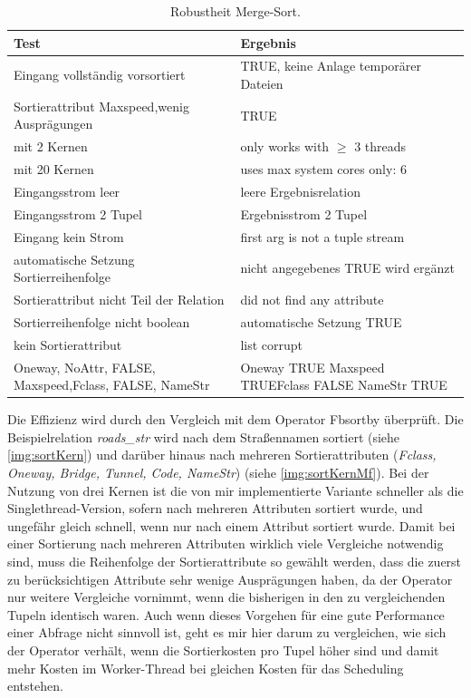 \documentclass[a4paper,12pt,twoside]{article}
\newcommand{\Fb}[1]{\textit{#1}} %
\begin{document}
\begin{table}
	\centering
	\begin{tabular}{|p{7.5cm}|p{7.5cm}|}
		\hline
		\rowcolor{gray!30}
		Test & Ergebnis \\
		\hline
		Eingang vollständig vorsortiert & TRUE, keine Anlage temporärer Dateien \\
		\hline
		Sortierattribut Maxspeed,\newline wenig Ausprägungen & TRUE  \\
		\hline
		mit 2 Kernen & only works with $\geq$ 3 threads  \\ 
		\hline
		mit 20 Kernen & uses max system cores only: 6 \\ 
		\hline
		Eingangsstrom leer & leere Ergebnisrelation \\ 
		\hline
		Eingangsstrom 2 Tupel & Ergebnisstrom 2 Tupel \\ 
		\hline
		Eingang kein Strom & first arg is not a tuple stream \\ 
		\hline
		automatische Setzung Sortierreihenfolge & nicht angegebenes TRUE wird ergänzt \\ 
		\hline
		Sortierattribut nicht Teil der Relation & did not find any attribute \\ 
		\hline
		Sortierreihenfolge nicht boolean & automatische Setzung TRUE \\ 
		\hline
		kein Sortierattribut & list corrupt \\
		\hline
		Oneway, NoAttr, FALSE, Maxspeed,\newline Fclass, FALSE, NameStr &  Oneway TRUE Maxspeed TRUE\newline Fclass FALSE NameStr TRUE \\
		\hline
\end{tabular}
	\caption{\label{tab:testSortRobust}Robustheit Merge-Sort.}
\end{table}

Die Effizienz wird durch den Vergleich mit dem Operator Fb{sortby} überprüft. Die Beispielrelation \Fb{roads\_str} wird nach dem Straßennamen sortiert (siehe \autoref{img:sortKern}) und darüber hinaus nach mehreren Sortierattributen (\Fb{Fclass, Oneway, Bridge, Tunnel, Code, NameStr}) (siehe \autoref{img:sortKernMf}). Bei der Nutzung von drei Kernen ist die von mir implementierte Variante schneller als die Singlethread-Version, sofern nach mehreren Attributen sortiert wurde, und ungefähr gleich schnell, wenn nur nach einem Attribut sortiert wurde. Damit bei einer Sortierung nach mehreren Attributen wirklich viele Vergleiche notwendig sind, muss die Reihenfolge der Sortierattribute so gewählt werden, dass die zuerst zu berücksichtigen Attribute sehr wenige Ausprägungen haben, da der Operator nur weitere Vergleiche vornimmt, wenn die bisherigen in den zu vergleichenden Tupeln identisch waren. Auch wenn dieses Vorgehen für eine gute Performance einer Abfrage nicht sinnvoll ist, geht es mir hier darum zu vergleichen, wie sich der Operator verhält, wenn die Sortierkosten pro Tupel höher sind und damit mehr Kosten im Worker-Thread bei gleichen Kosten für das Scheduling entstehen.  
\end{document}
